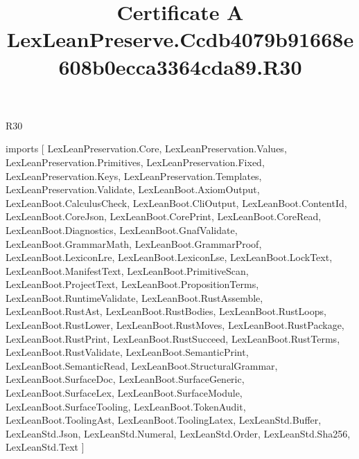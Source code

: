 \begin{lexlean}{R30}
\title{Certificate A LexLeanPreserve.Ccdb4079b91668e608b0ecca3364cda89.R30}
\begin{coremodule}
imports [
  LexLeanPreservation.Core,
  LexLeanPreservation.Values,
  LexLeanPreservation.Primitives,
  LexLeanPreservation.Fixed,
  LexLeanPreservation.Keys,
  LexLeanPreservation.Templates,
  LexLeanPreservation.Validate,
  LexLeanBoot.AxiomOutput,
  LexLeanBoot.CalculusCheck,
  LexLeanBoot.CliOutput,
  LexLeanBoot.ContentId,
  LexLeanBoot.CoreJson,
  LexLeanBoot.CorePrint,
  LexLeanBoot.CoreRead,
  LexLeanBoot.Diagnostics,
  LexLeanBoot.GnafValidate,
  LexLeanBoot.GrammarMath,
  LexLeanBoot.GrammarProof,
  LexLeanBoot.LexiconLre,
  LexLeanBoot.LexiconLse,
  LexLeanBoot.LockText,
  LexLeanBoot.ManifestText,
  LexLeanBoot.PrimitiveScan,
  LexLeanBoot.ProjectText,
  LexLeanBoot.PropositionTerms,
  LexLeanBoot.RuntimeValidate,
  LexLeanBoot.RustAssemble,
  LexLeanBoot.RustAst,
  LexLeanBoot.RustBodies,
  LexLeanBoot.RustLoops,
  LexLeanBoot.RustLower,
  LexLeanBoot.RustMoves,
  LexLeanBoot.RustPackage,
  LexLeanBoot.RustPrint,
  LexLeanBoot.RustSucceed,
  LexLeanBoot.RustTerms,
  LexLeanBoot.RustValidate,
  LexLeanBoot.SemanticPrint,
  LexLeanBoot.SemanticRead,
  LexLeanBoot.StructuralGrammar,
  LexLeanBoot.SurfaceDoc,
  LexLeanBoot.SurfaceGeneric,
  LexLeanBoot.SurfaceLex,
  LexLeanBoot.SurfaceModule,
  LexLeanBoot.SurfaceTooling,
  LexLeanBoot.TokenAudit,
  LexLeanBoot.ToolingAst,
  LexLeanBoot.ToolingLatex,
  LexLeanStd.Buffer,
  LexLeanStd.Json,
  LexLeanStd.Numeral,
  LexLeanStd.Order,
  LexLeanStd.Sha256,
  LexLeanStd.Text
]


\end{coremodule}
\end{lexlean}
